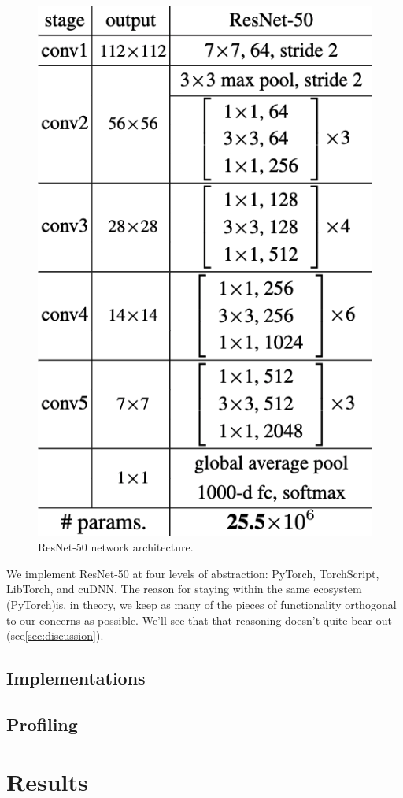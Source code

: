 \documentclass[sigconf]{acmart}
\begin{document}
\begin{figure}
  \includegraphics[width=.7\linewidth]{figures/resnet50.png}
  \caption{ResNet-50 network architecture\cite{he2015deep}.}
  \label{fig:resnet}
\end{figure}

We implement ResNet-50 at four levels of abstraction: PyTorch, TorchScript, LibTorch, and cuDNN.
The reason for staying within the same ecosystem (PyTorch)is, in theory, we keep as many of the pieces of functionality orthogonal to our concerns as possible.
We'll see that that reasoning doesn't quite bear out (see\ref{sec:discussion}).

\subsection{Implementations}\label{subsec:implementations}

\subsection{Profiling}\label{subsec:profiling}

\section{Results}\label{sec:results}
\end{document}
